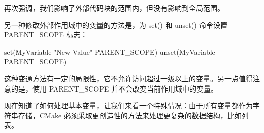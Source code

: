 再次强调，我们影响了外部代码块的范围内，但没有影响到全局范围。

另一种修改外部作用域中的变量的方法是，为 set() 和 unset() 命令设置 PARENT\_SCOPE 标志：

\begin{cmake}
set(MyVariable "New Value" PARENT_SCOPE)
unset(MyVariable PARENT_SCOPE)
\end{cmake}

这种变通方法有一定的局限性，它不允许访问超过一级以上的变量。另一点值得注意的是，使用 PARENT\_SCOPE 并不会改变当前作用域中的变量。

现在知道了如何处理基本变量，让我们来看一个特殊情况：由于所有变量都作为字符串存储，CMake 必须采取更创造性的方法来处理更复杂的数据结构，比如列表。











































